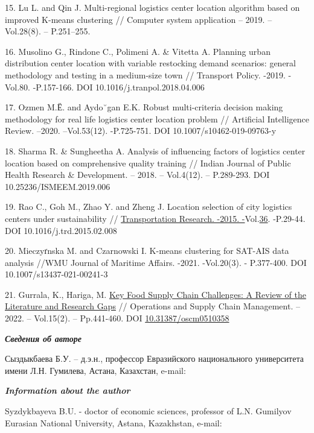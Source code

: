 15. Lu L. and Qin J. Multi-regional logistics center location algorithm
based on improved K-means clustering // Computer system application --
2019. -- Vol.28(8). -- P.251--255.

16. Musolino G., Rindone C., Polimeni A. \& Vitetta A. Planning urban
distribution center location with variable restocking demand scenarios:
general methodology and testing in a medium-size town // Transport
Policy. -2019. -Vol.80. -P.157-166. DOI 10.1016/j.tranpol.2018.04.006

17. Ozmen M.Ё. and Aydo˘gan E.K. Robust multi-criteria decision making
methodology for real life logistics center location problem //
Artificial Intelligence Review. --2020. --Vol.53(12). -P.725-751. DOI
10.1007/s10462-019-09763-y

18. Sharma R. \& Sungheetha A. Analysis of influencing factors of
logistics center location based on comprehensive quality training //
Indian Journal of Public Health Research \& Development. -- 2018. --
Vol.4(12). -- P.289-293. DOI 10.25236/ISMEEM.2019.006

19. Rao C., Goh M., Zhao Y. and Zheng J. Location selection of city
logistics centers under sustainability //
\href{https://www.sciencedirect.com/journal/transportation-research-part-d-transport-and-environment}{Transportation
Research. -2015.
-}Vol.\href{file:///C:/Users/admin/Desktop/загрузки/36}{36}. -P.29-44.
DOI 10.1016/j.trd.2015.02.008

20. Mieczyґnska M. and Czarnowski I. K-means clustering for SAT-AIS data
analysis //WMU Journal of Maritime Affairs. -2021. -Vol.20(3). -
P.377-400. DOI 10.1007/s13437-021-00241-3

21. Gurrala, K., Hariga, M.
\href{https://journal.oscm-forum.org/publication/article/key-food-supply-chain-challenges-a-review-of-the-literature-and-research-gaps}{Key
Food Supply Chain Challenges: A Review of the Literature and Research
Gaps} // Operations and Supply Chain Management. -- 2022. -- Vol.15(2).
-- Pp.441-460. DOI
\href{http://doi.org/10.31387/oscm0510358}{10.31387/oscm0510358}

\emph{{\bfseries Сведения об авторе}}

Сыздыкбаева Б.У. -- д.э.н., профессор Евразийского национального
университета имени Л.Н. Гумилева, Астана, Казахстан, e-mail:
\href{mailto:bakyt_syzdykbaeva@mail.ru}{}

\emph{{\bfseries Information about the author}}

Syzdykbayeva B.U. - doctor of economic sciences, professor of
L.N. Gumilyov Eurasian National University, Astana, Kazakhstan, e-mail:
\href{mailto:bakyt_syzdykbaeva@mail.ru}{}\